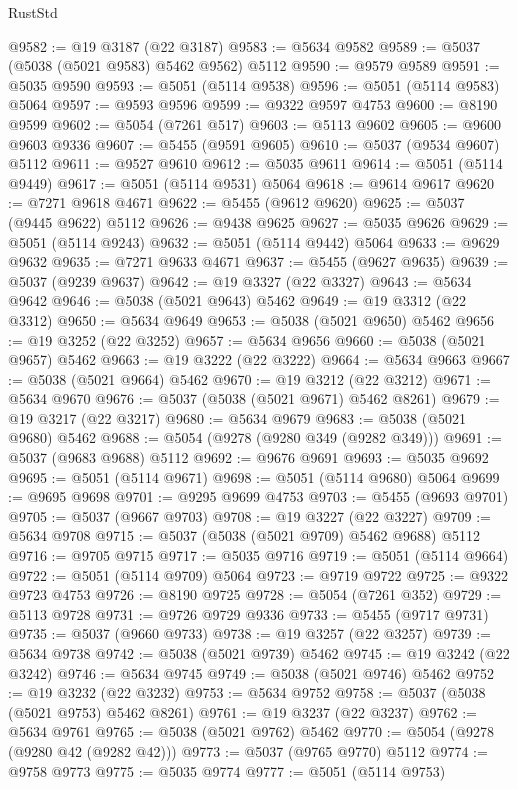 \begin{lexlean}{RustStd}
\begin{coremodule}
@9582 := @19 @3187 (@22 @3187)
@9583 := @5634 @9582
@9589 := @5037 (@5038 (@5021 @9583) @5462 @9562) @5112
@9590 := @9579 @9589
@9591 := @5035 @9590
@9593 := @5051 (@5114 @9538)
@9596 := @5051 (@5114 @9583) @5064
@9597 := @9593 @9596
@9599 := @9322 @9597 @4753
@9600 := @8190 @9599
@9602 := @5054 (@7261 @517)
@9603 := @5113 @9602
@9605 := @9600 @9603 @9336
@9607 := @5455 (@9591 @9605)
@9610 := @5037 (@9534 @9607) @5112
@9611 := @9527 @9610
@9612 := @5035 @9611
@9614 := @5051 (@5114 @9449)
@9617 := @5051 (@5114 @9531) @5064
@9618 := @9614 @9617
@9620 := @7271 @9618 @4671
@9622 := @5455 (@9612 @9620)
@9625 := @5037 (@9445 @9622) @5112
@9626 := @9438 @9625
@9627 := @5035 @9626
@9629 := @5051 (@5114 @9243)
@9632 := @5051 (@5114 @9442) @5064
@9633 := @9629 @9632
@9635 := @7271 @9633 @4671
@9637 := @5455 (@9627 @9635)
@9639 := @5037 (@9239 @9637)
@9642 := @19 @3327 (@22 @3327)
@9643 := @5634 @9642
@9646 := @5038 (@5021 @9643) @5462
@9649 := @19 @3312 (@22 @3312)
@9650 := @5634 @9649
@9653 := @5038 (@5021 @9650) @5462
@9656 := @19 @3252 (@22 @3252)
@9657 := @5634 @9656
@9660 := @5038 (@5021 @9657) @5462
@9663 := @19 @3222 (@22 @3222)
@9664 := @5634 @9663
@9667 := @5038 (@5021 @9664) @5462
@9670 := @19 @3212 (@22 @3212)
@9671 := @5634 @9670
@9676 := @5037 (@5038 (@5021 @9671) @5462 @8261)
@9679 := @19 @3217 (@22 @3217)
@9680 := @5634 @9679
@9683 := @5038 (@5021 @9680) @5462
@9688 := @5054 (@9278 (@9280 @349 (@9282 @349)))
@9691 := @5037 (@9683 @9688) @5112
@9692 := @9676 @9691
@9693 := @5035 @9692
@9695 := @5051 (@5114 @9671)
@9698 := @5051 (@5114 @9680) @5064
@9699 := @9695 @9698
@9701 := @9295 @9699 @4753
@9703 := @5455 (@9693 @9701)
@9705 := @5037 (@9667 @9703)
@9708 := @19 @3227 (@22 @3227)
@9709 := @5634 @9708
@9715 := @5037 (@5038 (@5021 @9709) @5462 @9688) @5112
@9716 := @9705 @9715
@9717 := @5035 @9716
@9719 := @5051 (@5114 @9664)
@9722 := @5051 (@5114 @9709) @5064
@9723 := @9719 @9722
@9725 := @9322 @9723 @4753
@9726 := @8190 @9725
@9728 := @5054 (@7261 @352)
@9729 := @5113 @9728
@9731 := @9726 @9729 @9336
@9733 := @5455 (@9717 @9731)
@9735 := @5037 (@9660 @9733)
@9738 := @19 @3257 (@22 @3257)
@9739 := @5634 @9738
@9742 := @5038 (@5021 @9739) @5462
@9745 := @19 @3242 (@22 @3242)
@9746 := @5634 @9745
@9749 := @5038 (@5021 @9746) @5462
@9752 := @19 @3232 (@22 @3232)
@9753 := @5634 @9752
@9758 := @5037 (@5038 (@5021 @9753) @5462 @8261)
@9761 := @19 @3237 (@22 @3237)
@9762 := @5634 @9761
@9765 := @5038 (@5021 @9762) @5462
@9770 := @5054 (@9278 (@9280 @42 (@9282 @42)))
@9773 := @5037 (@9765 @9770) @5112
@9774 := @9758 @9773
@9775 := @5035 @9774
@9777 := @5051 (@5114 @9753)

\end{coremodule}
\end{lexlean}
